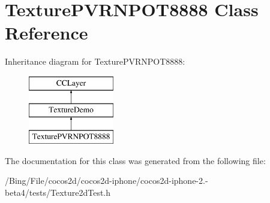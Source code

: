 \hypertarget{interface_texture_p_v_r_n_p_o_t8888}{\section{Texture\-P\-V\-R\-N\-P\-O\-T8888 Class Reference}
\label{interface_texture_p_v_r_n_p_o_t8888}
}
Inheritance diagram for Texture\-P\-V\-R\-N\-P\-O\-T8888\-:\begin{figure}[H]
\begin{center}
\leavevmode
\includegraphics[height=3.000000cm]{interface_texture_p_v_r_n_p_o_t8888}
\end{center}
\end{figure}


The documentation for this class was generated from the following file\-:\begin{DoxyCompactItemize}
\item 
/\-Bing/\-File/cocos2d/cocos2d-\/iphone/cocos2d-\/iphone-\/2.-\/beta4/tests/Texture2d\-Test.\-h\end{DoxyCompactItemize}
